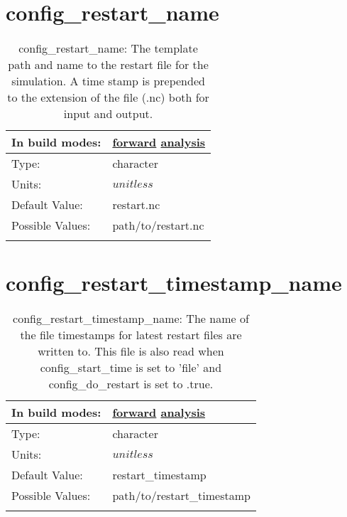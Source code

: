 \section[config\_restart\_name]{config\_restart\_name}
\label{sec:nm_sec_config_restart_name}
\begin{center}
\begin{longtable}{| p{2.0in} || p{4.0in} |}
    \hline
    In build modes: & \hyperref[subsec:forward_nm_tab_io]{forward} \hyperref[subsec:analysis_nm_tab_io]{analysis} \\
    \hline
    Type: & character \\
    \hline
    Units: & $unitless$ \\
    \hline
    Default Value: & restart.nc \\
    \hline
    Possible Values: & path/to/restart.nc \\
    \hline
    \caption{config\_restart\_name: The template path and name to the restart file for the simulation. A time stamp is prepended to the extension of the file (.nc) both for input and output.}
\end{longtable}
\end{center}
\section[config\_restart\_timestamp\_name]{config\_restart\_timestamp\_name}
\label{sec:nm_sec_config_restart_timestamp_name}
\begin{center}
\begin{longtable}{| p{2.0in} || p{4.0in} |}
    \hline
    In build modes: & \hyperref[subsec:forward_nm_tab_io]{forward} \hyperref[subsec:analysis_nm_tab_io]{analysis} \\
    \hline
    Type: & character \\
    \hline
    Units: & $unitless$ \\
    \hline
    Default Value: & restart\_timestamp \\
    \hline
    Possible Values: & path/to/restart\_timestamp \\
    \hline
    \caption{config\_restart\_timestamp\_name: The name of the file timestamps for latest restart files are written to. This file is also read when config\_start\_time is set to 'file' and config\_do\_restart is set to .true.}
\end{longtable}
\end{center}
